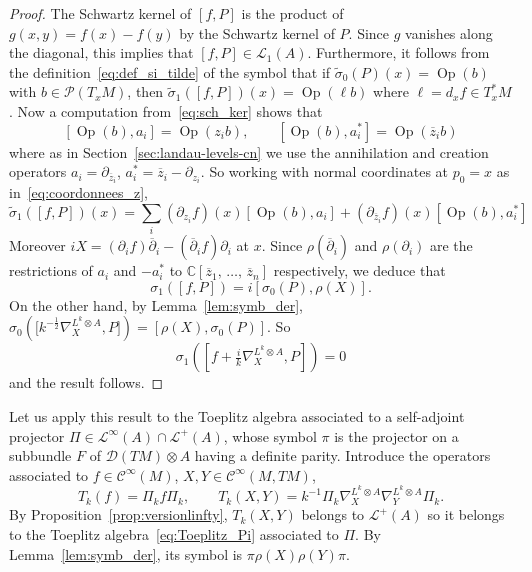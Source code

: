 \documentclass[10pt,a4paper]{article}
\theoremstyle{definition}
\numberwithin{equation}{section}
\newcommand{\C}{{\mathbb{C}}}
\newcommand{\si}{{\sigma}}
\newcommand{\con}{\overline}
\newcommand{\op}{\operatorname}
\newcommand{\wt}{\widetilde}
\newcommand{\Ci}{{\mathcal{C}}^{\infty}}
\newcommand{\D}{\mathcal{D}}
\newcommand{\lag}{\mathcal{L}}
\newcommand{\pol}{\mathcal{P}}
\begin{document}
\begin{proof}
The Schwartz kernel of $[f, P]$ is the product of $g(x,y)= f(x) -
f(y)$ by the Schwartz kernel of $P$. Since $g$ vanishes along the diagonal, this implies that $[f, P] \in \lag_1 (A)$. Furthermore, it follows from the definition~\eqref{eq:def_si_tilde} of the symbol that if $\wt{\si}_0 (P)(x) = \op{Op} (b)$ with $b \in \pol (T_xM)$, then $\wt{\si}_1 ([f, P])(x) = \op{Op} (\ell b)$ where $\ell = d_x f \in T_x^*M$. Now a computation from~\eqref{eq:sch_ker} shows that
\[
\left[\op{Op} (b), a_i\right] = \op{Op} (z_i b), \qquad \left[\op{Op} (b), a_i^*\right] = \op{Op} (\con{z}_i b)
\]
where as in Section~\ref{sec:landau-levels-cn} we use the annihilation and creation operators $a_i = \partial_{\con{z}_i}$, $a_i^* = \con{z}_i -
\partial_{z_i}$.  So working with normal coordinates at $p_0 =x$ as in~\eqref{eq:coordonnees_z},
\[
\wt{\si}_1 ([f, P])(x) = \sum_i (\partial_{z_i} f)(x) [\op{Op} (b), a_i] + (\partial_{\con{z}_i} f)(x) [\op{Op} (b), a_i^*]
\]
Moreover $ i X = (\partial_i f) \con{\partial}_i - (\con{\partial}_if)
\partial_i $ at $x$. Since $ \rho (\con{\partial}_i)$ and $\rho (\partial_i)$ are the restrictions of $a_i$ and $-a_i^*$ to $\C[\con{z}_1,\,
\ldots,\,\con{z}_n]$ respectively, we deduce that
\[
\si_1 ([f, P]) = i [\si_0 (P), \rho(X)].
\]
On the other hand, by Lemma~\ref{lem:symb_der}, $\si_0 (\bigl[k^{-\frac{1}{2}}
\nabla_X^{L^k \otimes A}, P]) = [\rho(X), \si_0 (P)]$. So
\[
\si_1 \left(\left[f + \tfrac{i}{k} \nabla_X^{L^k \otimes A}, P\right]\right) =0
\]
and the result follows. 
\end{proof}

Let us apply this result to the Toeplitz algebra associated to a self-adjoint projector $\Pi \in \lag^{\infty}(A) \cap \lag^{+}(A)$, whose symbol $\pi$ is the projector on a subbundle $F$ of $\D (TM) \otimes A$ having a definite parity. Introduce the operators associated to $f \in \Ci (M)$, $X, Y \in
\Ci (M, TM)$,
\[
T_k (f) = \Pi_k f \Pi_k, \qquad T_k (X, Y) = k^{-1} \Pi_k \nabla^{L^k
\otimes A}_X \nabla^{L^k
\otimes A}_Y \Pi_k.
\]
By Proposition~\ref{prop:versionlinfty}, $T_k (X, Y)$ belongs to $\lag ^+(A)$ so it belongs to the Toeplitz algebra~\eqref{eq:Toeplitz_Pi} associated to $\Pi$. By Lemma~\ref{lem:symb_der}, its symbol is $\pi \rho (X) \rho (Y)
\pi$.
\end{document}
